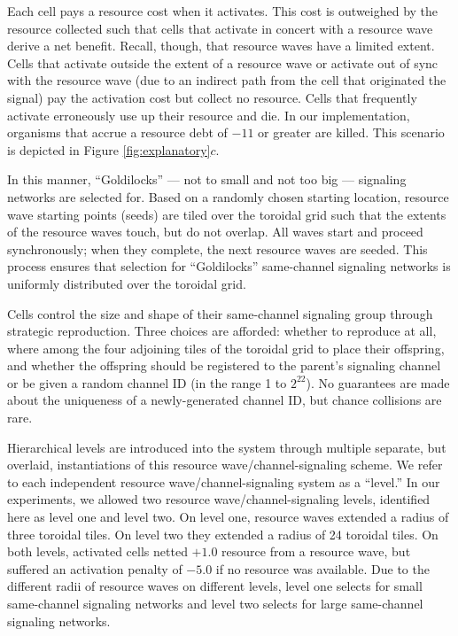 Each cell pays a resource cost when it activates.
This cost is outweighed by the resource collected such that cells that activate in concert with a resource wave derive a net benefit.
Recall, though, that resource waves have a limited extent.
Cells that activate outside the extent of a resource wave or activate out of sync with the resource wave (due to an indirect path from the cell that originated the signal) pay the activation cost but collect no resource.
Cells that frequently activate erroneously use up their resource and die.
In our implementation, organisms that accrue a resource debt of $-11$ or greater are killed.
This scenario is depicted in Figure \ref{fig:explanatory}$c$.

In this manner, ``Goldilocks'' --- not to small and not too big --- signaling networks are selected for.
Based on a randomly chosen starting location, resource wave starting points (seeds) are tiled over the toroidal grid such that the extents of the resource waves touch, but do not overlap.
All waves start and proceed synchronously;
when they complete, the next resource waves are seeded.
This process ensures that selection for ``Goldilocks'' same-channel signaling networks is uniformly distributed over the toroidal grid.

Cells control the size and shape of their same-channel signaling group through strategic reproduction.
Three choices are afforded: whether to reproduce at all, where among the four adjoining tiles of the toroidal grid to place their offspring, and whether the offspring should be registered to the parent's signaling channel or be given a random channel ID (in the range 1 to $2^{22}$).
No guarantees are made about the uniqueness of a newly-generated channel ID, but chance collisions are rare.

Hierarchical levels are introduced into the system through multiple separate, but overlaid, instantiations of this resource wave/channel-signaling scheme.
We refer to each independent resource wave/channel-signaling system as a ``level.''
In our experiments, we allowed two resource wave/channel-signaling levels, identified here as level one and level two.
On level one, resource waves extended a radius of three toroidal tiles.
On level two they extended a radius of 24 toroidal tiles.
On both levels, activated cells netted $+1.0$ resource from a resource wave, but suffered an activation penalty of $-5.0$ if no resource was available.
Due to the different radii of resource waves on different levels, level one selects for small same-channel signaling networks and level two selects for large same-channel signaling networks.

